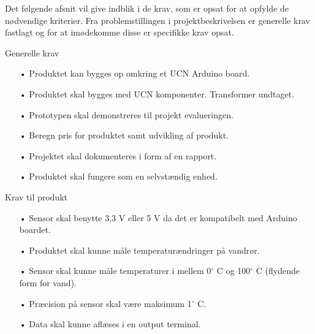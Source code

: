 Det følgende afsnit vil give indblik i de krav, som er opsat for at opfylde de nødvendige kriterier. Fra problemstillingen i projektbeskrivelsen er generelle krav fastlagt og for at imødekomme disse er specifikke krav opsat.  

\hfill \break
Generelle krav
\begin{enumerate}
	\item[•]Produktet kan bygges op omkring et UCN Arduino board. 
	\item[•]Produktet skal bygges med UCN komponenter. Transformer undtaget.
	\item[•]Prototypen skal demonstreres til projekt evalueringen. 
	\item[•]Beregn pris for produktet samt udvikling af produkt.
	\item[•]Projektet skal dokumenteres i form af en rapport.
	\item[•]Produktet skal fungere som en selvstændig enhed.
\end{enumerate}	

Krav til produkt
\begin{enumerate}
	\item[•]Sensor skal benytte 3,3 V eller 5 V da det er kompatibelt med Arduino boardet.
	\item[•]Produktet skal kunne måle temperaturændringer på vandrør.
	\item[•]Sensor skal kunne måle temperaturer i mellem 0$^{\circ}$ C og 100$^{\circ}$ C (flydende form for vand).
	\item[•]Præcision på sensor skal være maksimum 1$^{\circ}$ C.
	\item[•]Data skal kunne aflæses i en output terminal.
\end{enumerate}	
	
